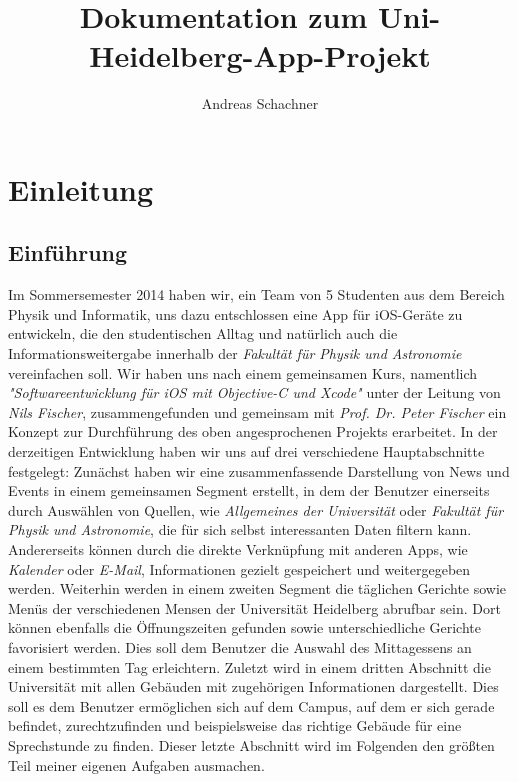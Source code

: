 \documentclass{report}
\author{Andreas Schachner}
\title{Dokumentation zum Uni-Heidelberg-App-Projekt}
\begin{document}
\maketitle
\newpage
\setcounter{page}{1}
\tableofcontents
\newpage
{}

\chapter{Einleitung}

\section{Einführung}

Im Sommersemester 2014 haben wir, ein Team von 5 Studenten aus dem Bereich Physik und Informatik, uns dazu entschlossen eine App für iOS-Geräte zu entwickeln, die den studentischen Alltag und natürlich auch die Informationsweitergabe innerhalb der \emph{Fakultät für Physik und Astronomie} vereinfachen soll. Wir haben uns nach einem gemeinsamen Kurs, namentlich \emph{"Softwareentwicklung für iOS mit Objective-C und Xcode"} unter der Leitung von \emph{Nils Fischer}, zusammengefunden und gemeinsam mit \emph{Prof. Dr. Peter Fischer} ein Konzept zur Durchführung des oben angesprochenen Projekts erarbeitet. In der derzeitigen Entwicklung haben wir uns auf drei verschiedene Hauptabschnitte festgelegt: Zunächst haben wir eine zusammenfassende Darstellung von News und Events in einem gemeinsamen Segment erstellt, in dem der Benutzer einerseits durch Auswählen von Quellen, wie \emph{Allgemeines der Universität} oder \emph{Fakultät für Physik und Astronomie}, die für sich selbst interessanten Daten filtern kann. Andererseits können durch die direkte Verknüpfung mit anderen Apps, wie \emph{Kalender} oder \emph{E-Mail}, Informationen gezielt gespeichert und weitergegeben werden. Weiterhin werden in einem zweiten Segment die täglichen Gerichte sowie Menüs der verschiedenen Mensen der Universität Heidelberg abrufbar sein. Dort können ebenfalls die Öffnungszeiten gefunden sowie unterschiedliche Gerichte favorisiert werden. Dies soll dem Benutzer die Auswahl des Mittagessens an einem bestimmten Tag erleichtern. Zuletzt wird in einem dritten Abschnitt die Universität mit allen Gebäuden mit zugehörigen Informationen dargestellt. Dies soll es dem Benutzer ermöglichen sich auf dem Campus, auf dem er sich gerade befindet, zurechtzufinden und beispielsweise das richtige Gebäude für eine Sprechstunde zu finden. Dieser letzte Abschnitt wird im Folgenden den größten Teil meiner eigenen Aufgaben ausmachen.
\end{document}
